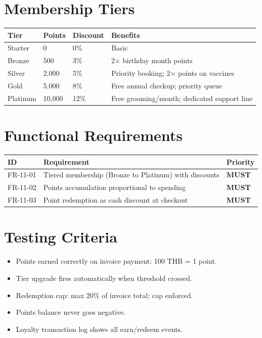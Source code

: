 \documentclass[12pt,a4paper]{report}
\newcommand{\must}{\colorbox{red!15}{\color{errorred}\textbf{\small MUST}}}
\newcommand{\testcheck}{\textcolor{successgreen}{\ding{51}}}
\begin{document}
\section{Membership Tiers}

\begin{longtable}{L{2.5cm} C{2cm} C{3cm} L{6cm}}
\toprule
\textbf{Tier} & \textbf{Points} & \textbf{Discount} & \textbf{Benefits} \\\midrule\endhead\bottomrule\endfoot
Starter  & 0      & 0\%   & Basic \\
Bronze   & 500    & 3\%   & 2$\times$ birthday month points \\
Silver   & 2,000  & 5\%   & Priority booking; 2$\times$ points on vaccines \\
Gold     & 5,000  & 8\%   & Free annual checkup; priority queue \\
Platinum & 10,000 & 12\%  & Free grooming/month; dedicated support line \\
\end{longtable}

\section{Functional Requirements}

\begin{longtable}{L{2.5cm} L{9cm} C{2cm}}
\toprule
\textbf{ID} & \textbf{Requirement} & \textbf{Priority} \\\midrule\endhead\bottomrule\endfoot
FR-11-01 & Tiered membership (Bronze to Platinum) with discounts & \must \\
FR-11-02 & Points accumulation proportional to spending & \must \\
FR-11-03 & Point redemption as cash discount at checkout & \must \\
\end{longtable}

\section{Testing Criteria}

\begin{itemize}
  \item[\testcheck] Points earned correctly on invoice payment: 100 THB = 1 point.
  \item[\testcheck] Tier upgrade fires automatically when threshold crossed.
  \item[\testcheck] Redemption cap: max 20\% of invoice total; cap enforced.
  \item[\testcheck] Points balance never goes negative.
  \item[\testcheck] Loyalty transaction log shows all earn/redeem events.
\end{itemize}
\end{document}
